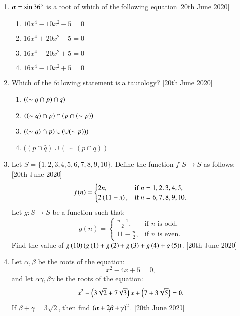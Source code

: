 \documentclass[journal,12pt,onecolumn]{IEEEtran}
\theoremstyle{remark}
\begin{document}
\begin{enumerate}
    \item $\alpha = \sin 36\degree$ is a root of which of the following equation \hfill{[20th June 2020]}
    \begin{multicols}{2}
    \begin{enumerate}
        \item $10x^4 - 10x^2 -5 = 0$
        \item $16x^4 + 20x^2 -5 = 0$
        \item $16x^4 - 20x^2 +5 = 0$
        \item $16x^4 - 10x^2 +5 = 0$
    \end{enumerate}
    \end{multicols}

    \item Which of the following statement is a tautology?  \hfill{[20th June 2020]}
    \begin{multicols}{2}
    \begin{enumerate}
        \item $\left(\left(\sim q \cap p\right)\cap q\right) $
        \item $\left(\left(\sim q\right) \cap p\right) \cap \left(p \cap \left(\sim p\right)\right)$
        \item $\left(\left(\sim q\right) \cap p\right) \cup \left( \cup (\sim p))\right)$
        \item $((p\cap \hat q)\cup (\sim(p \cap q))$
    \end{enumerate}
    \end{multicols}

    
    \item Let $ S = \{1, 2, 3, 4, 5, 6, 7, 8, 9, 10\} $. Define the function $ f: S \to S $ as follows:  \hfill{[20th June 2020]}
    \[
    f(n) = 
    \begin{cases}
    2n, & \text{if } n = 1, 2, 3, 4, 5, \\
    2\left(11 - n\right), & \text{if } n = 6, 7, 8, 9, 10.
    \end{cases}
    \]
    Let $ g: S \to S $ be a function such that:
    \[
    g(n) =
    \begin{cases}
    \frac{n+1}{2}, & \text{if } n \text{ is odd}, \\
    11 - \frac{n}{2}, & \text{if } n \text{ is even}.
    \end{cases}
    \]
    Find the value of $ g\left(10\right) \left( g\left(1\right) + g\left(2\right) + g\left(3\right) + g\left(4\right) + g\left(5\right) \right) $.  \hfill{[20th June 2020]}

    \item Let $ \alpha, \beta $ be the roots of the equation: 
    \[
    x^2 - 4x + 5 = 0,
    \]
    and let $ \alpha \gamma, \beta \gamma $ be the roots of the equation:
    \[
    x^2 - \left(3\sqrt{2} + 7\sqrt{3}\right)x + \left(7 + 3\sqrt{5}\right) = 0.
    \]
    If $ \beta + \gamma = 3\sqrt{2} $, then find $ \left(\alpha + 2\beta + \gamma\right)^2 $. \hfill{[20th June 2020]}


\end{enumerate}
\end{document}
